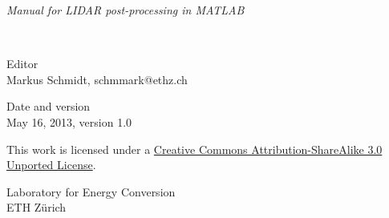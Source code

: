 \begin{titlepage}
\begin{center}

\begin{LARGE}
\emph{Manual for LIDAR post-processing in MATLAB} \end{LARGE}\\
\vfill

\vfill
Editor \\
Markus Schmidt, schmmark@ethz.ch

\vfill

\vfill
Date and version \\
May 16, 2013, version 1.0

\vfill
{\large 
This work is licensed under a \href{http://creativecommons.org/licenses/by-sa/3.0/deed.en_GB}{Creative Commons Attribution-ShareAlike 3.0 Unported License}.}

\vfill
{\large Laboratory for Energy Conversion\\
ETH Zürich}

\end{center}
\end{titlepage}